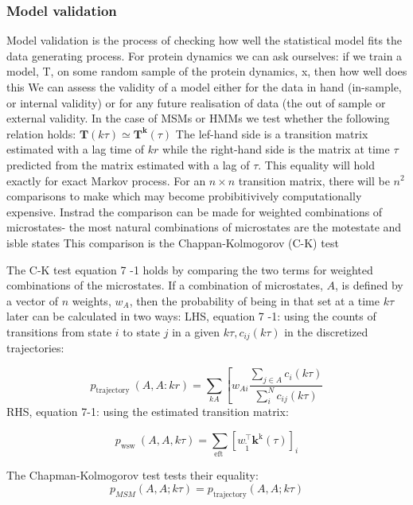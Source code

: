 \subsubsection{Model validation}

Model validation is the process of checking how well the statistical model fits the data generating process. For protein dynamics we can ask ourselves: if we train a model, T, on some random sample of the protein dynamics, x, then how well does this We can assess the validity of a model either for the data in hand (in-sample, or internal validity) or for any future realisation of data (the out of sample or external validity. In the case of MSMs or HMMs we test whether the following relation holds:
$\mathbf{T}(k \tau) \simeq \mathbf{T}^{\mathbf{k}}(\tau)$
The lef-hand side is a transition matrix estimated with a lag time of $k r$ while the right-hand side is the matrix at time $\tau$ predicted from the matrix estimated with a lag of $\tau$. This equality will hold exactly for exact Markov process. For an $n \times n$ transition matrix, there will be $n^{2}$ comparisons to make which may become probibitivively computationally expensive. Instrad the comparison can be made for weighted combinations of microstates- the most natural combinations of microstates are the motestate and isble states This comparison is the Chappan-Kolmogorov (C-K) test

The C-K test equation 7 -1 holds by comparing the two terms for weighted combinations of the microstates. If a combination of microstates, $A$, is defined by a vector of $n$ weights, $w_{A}$, then the probability of being in that set at a time $k \tau$ later can be calculated in two ways:
LHS, equation 7 -1: using the counts of transitions from state $i$ to state $j$ in a given $k \tau, c_{i j}(k \tau)$ in the discretized trajectories:

\begin{equation}
p_{\text {trajectory }}(A, A: k r)=\sum_{k A}\left[w_{A i} \frac{\sum_{j \in A} c_{i}(k \tau)}{\sum_{i}^{N} c_{i j}(k \tau)}\right.
\end{equation}
RHS, equation 7-1: using the estimated transition matrix:

\begin{equation}
p_{\text {wsw }}(A, A, k \tau)=\sum_{\text {eft }}\left[w_{\tilde{1}}^{\top} \mathbf{k}^{\mathrm{k}}(\tau)\right]_{i}
\end{equation}

The Chapman-Kolmogorov test tests their equality:
\begin{equation}\label{eqn:ck_test}
p_{M S M}(A, A ; k \tau)=p_{\text {trajectory}}(A, A ; k \tau)
\end{equation}

